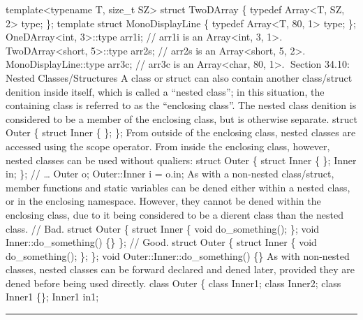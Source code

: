 template\textless typename T, size\_t SZ\textgreater{} struct TwoDArray
\{ typedef Array\textless T, SZ, 2\textgreater{} type; \}; template
struct MonoDisplayLine \{ typedef Array\textless T, 80, 1\textgreater{}
type; \}; OneDArray\textless int, 3\textgreater::type arr1i; // arr1i is
an Array\textless int, 3, 1\textgreater. TwoDArray\textless short,
5\textgreater::type arr2s; // arr2s is an Array\textless short, 5,
2\textgreater. MonoDisplayLine::type arr3c; // arr3c is an
Array\textless char, 80, 1\textgreater. Section 34.10: Nested
Classes/Structures A class or struct can also contain another
class/struct denition inside itself, which is called a ``nested class'';
in this situation, the containing class is referred to as the
``enclosing class''. The nested class denition is considered to be a
member of the enclosing class, but is otherwise separate. struct Outer
\{ struct Inner \{ \}; \}; From outside of the enclosing class, nested
classes are accessed using the scope operator. From inside the enclosing
class, however, nested classes can be used without qualiers: struct
Outer \{ struct Inner \{ \}; Inner in; \}; // \ldots{} Outer o;
Outer::Inner i = o.in; As with a non-nested class/struct, member
functions and static variables can be dened either within a nested
class, or in the enclosing namespace. However, they cannot be dened
within the enclosing class, due to it being considered to be a dierent
class than the nested class. // Bad. struct Outer \{ struct Inner \{
void do\_something(); \}; void Inner::do\_something() \{\} \}; // Good.
struct Outer \{ struct Inner \{ void do\_something(); \}; \}; void
Outer::Inner::do\_something() \{\} As with non-nested classes, nested
classes can be forward declared and dened later, provided they are dened
before being used directly. class Outer \{ class Inner1; class Inner2;
class Inner1 \{\}; Inner1 in1;

\begin{center}\rule{0.5\linewidth}{0.5pt}\end{center}
